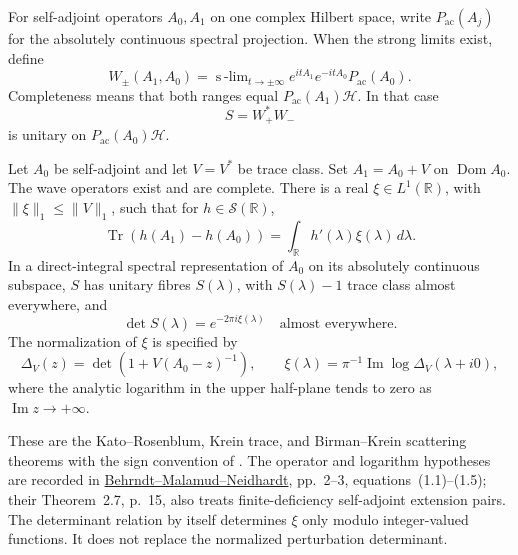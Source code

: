 \begin{definition}
\label{v4-arith:w7-j:def:wave-operators}
For self-adjoint operators \(A_0,A_1\) on one complex Hilbert space,
write \(P_{\mathrm{ac}}(A_j)\) for the absolutely continuous spectral
projection. When the strong limits exist, define
\begin{equation}
\label{v4-arith:w7-j:eq:wave-operators}
 W_\pm(A_1,A_0)=\mathop{\mathrm{s}\!\!-
 lim}_{t\to\pm\infty}e^{itA_1}e^{-itA_0}P_{\mathrm{ac}}(A_0).
\end{equation}
Completeness means that both ranges equal
\(P_{\mathrm{ac}}(A_1)\mathcal H\). In that case
\begin{equation}
\label{v4-arith:w7-j:eq:S-operator}
 S=W_+^*W_-
\end{equation}
is unitary on \(P_{\mathrm{ac}}(A_0)\mathcal H\).
\end{definition}

\begin{theorem}
\label{v4-arith:w7-j:prop:birman-krein}
Let \(A_0\) be self-adjoint and let \(V=V^*\) be trace class.
Set \(A_1=A_0+V\) on \(\operatorname{Dom}A_0\).
The wave operators exist and are complete. There is a real
\(\xi\in L^1(\mathbb R)\), with
\(\|\xi\|_1\leq\|V\|_1\), such that for \(h\in\mathscr S(\mathbb R)\),
\begin{equation}
\label{v4-arith:w7-j:eq:birman-krein}
 \operatorname{Tr}(h(A_1)-h(A_0))
 =\int_{\mathbb R}h'(\lambda)\xi(\lambda)\,d\lambda.
\end{equation}
In a direct-integral spectral representation of \(A_0\) on its
absolutely continuous subspace, \(S\) has unitary fibres
\(S(\lambda)\), with \(S(\lambda)-1\) trace class almost everywhere,
and
\begin{equation}
\label{v4-arith:w7-j:eq:BK-det}
 \det S(\lambda)=e^{-2\pi i\xi(\lambda)}\quad\text{almost everywhere}.
\end{equation}
The normalization of \(\xi\) is specified by
\[
 \Delta_V(z)=\det(1+V(A_0-z)^{-1}),\qquad
 \xi(\lambda)=\pi^{-1}\operatorname{Im}\log\Delta_V(\lambda+i0),
\]
where the analytic logarithm in the upper half-plane tends to zero
as \(\operatorname{Im}z\to+\infty\).
\end{theorem}

These are the Kato--Rosenblum, Krein trace, and Birman--Krein
scattering theorems with the sign convention of
.
The operator and logarithm hypotheses are recorded in
\href{https://arxiv.org/pdf/0712.3120}{Behrndt--Malamud--Neidhardt},
pp.~2--3, equations~(1.1)--(1.5); their Theorem~2.7, p.~15,
also treats finite-deficiency self-adjoint extension pairs.
The determinant relation by itself determines \(\xi\) only modulo
integer-valued functions. It does not replace the normalized
perturbation determinant.


